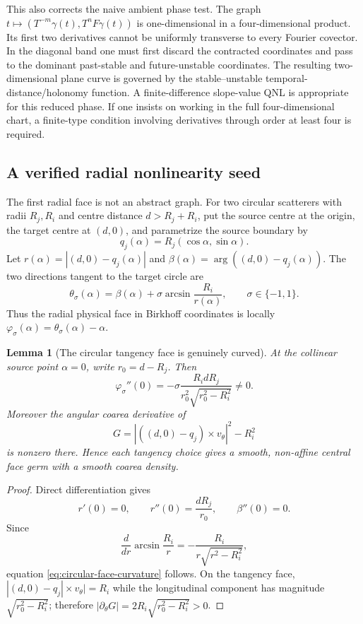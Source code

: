 \documentclass[11pt]{article}
\newtheorem{lemma}[theorem]{Lemma}
\begin{document}
This also corrects the naive ambient phase test.  The graph
$t\mapsto(T^{-m}\gamma(t),T^nF\gamma(t))$ is one-dimensional in a
four-dimensional product.  Its first two derivatives cannot be uniformly
transverse to every Fourier covector.  In the diagonal band one must first
discard the contracted coordinates and pass to the dominant past-stable and
future-unstable coordinates.  The resulting two-dimensional plane curve is
governed by the stable--unstable temporal-distance/holonomy function.  A
finite-difference slope-value QNL is appropriate for this reduced phase.  If
one insists on working in the full four-dimensional chart, a finite-type
condition involving derivatives through order at least four is required.

\subsection{A verified radial nonlinearity seed}

The first radial face is not an abstract graph.  For two circular scatterers
with radii $R_j,R_i$ and centre distance $d>R_j+R_i$, put the source centre at
the origin, the target centre at $(d,0)$, and parametrize the source boundary
by
\[
 q_j(\alpha)=R_j(\cos\alpha,\sin\alpha).
\]
Let $r(\alpha)=|(d,0)-q_j(\alpha)|$ and
$\beta(\alpha)=\arg((d,0)-q_j(\alpha))$.  The two directions tangent to the
target circle are
\[
 \theta_\sigma(\alpha)
 =\beta(\alpha)+\sigma\arcsin\frac{R_i}{r(\alpha)},
 \qquad \sigma\in\{-1,1\}.
\]
Thus the radial physical face in Birkhoff coordinates is locally
$\varphi_\sigma(\alpha)=\theta_\sigma(\alpha)-\alpha$.

\begin{lemma}[The circular tangency face is genuinely curved]
\label{lem:circular-face-curvature}
At the collinear source point $\alpha=0$, write $r_0=d-R_j$.  Then
\begin{equation}
\label{eq:circular-face-curvature}
 \varphi_\sigma''(0)
 =-\sigma\frac{R_i dR_j}
 {r_0^2\sqrt{r_0^2-R_i^2}}\ne0.
\end{equation}
Moreover the angular coarea derivative of
\[
 G=|((d,0)-q_j)\times v_\theta|^2-R_i^2
\]
is nonzero there.  Hence each tangency choice gives a smooth, non-affine
central face germ with a smooth coarea density.
\end{lemma}

\begin{proof}
Direct differentiation gives
\[
 r'(0)=0,\qquad r''(0)=\frac{dR_j}{r_0},\qquad
 \beta''(0)=0.
\]
Since
\[
 \frac d{dr}\arcsin\frac{R_i}{r}
 =-\frac{R_i}{r\sqrt{r^2-R_i^2}},
\]
equation \eqref{eq:circular-face-curvature} follows.  On the tangency face,
$|(d,0)-q_j|\times v_\theta|=R_i$ while the longitudinal component has
magnitude $\sqrt{r_0^2-R_i^2}$; therefore
$|\partial_\theta G|=2R_i\sqrt{r_0^2-R_i^2}>0$.
\end{proof}
\end{document}

